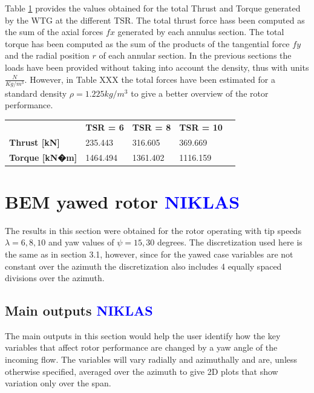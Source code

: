 Table \ref{total_forces_alligned} provides the values obtained for the total Thrust and Torque generated by the WTG at the different TSR. The total thrust force hass been computed as the sum of the axial forces $fx$ generated by each annulus section. The total torque has been computed as the sum of the products of the tangential force $fy$ and the radial position $r$ of each annular section. In the previous sections the loads have been provided without taking into account the density, thus with units $ \frac{N}{Kg/m^3} $. However, in Table XXX the total forces have been estimated for a standard density $\rho = 1.225 kg/m^3$ to give a better overview of the rotor performance.

\begin{table}[htpb]
\begin{tabular}{lllll}
\cline{2-4}
\multicolumn{1}{l|}{}                            & \multicolumn{1}{l|}{\textbf{TSR = 6}} & \multicolumn{1}{l|}{\textbf{TSR = 8}} & \multicolumn{1}{l|}{\textbf{TSR = 10}} &  \\ \cline{1-4}
\multicolumn{1}{|l|}{\textbf{Thrust {[}kN{]}}}   & \multicolumn{1}{l|}{235.443}          & \multicolumn{1}{l|}{316.605}          & \multicolumn{1}{l|}{369.669}           &  \\ \cline{1-4}
\multicolumn{1}{|l|}{\textbf{Torque {[}kN�m{]}}} & \multicolumn{1}{l|}{1464.494}         & \multicolumn{1}{l|}{1361.402}         & \multicolumn{1}{l|}{1116.159}          &  \\ \cline{1-4}
\end{tabular}
\label{total_forces_alligned}
\end{table}


\section{BEM yawed rotor \textcolor{blue}{NIKLAS}}

The results in this section were obtained for the rotor operating with tip speeds $\lambda = 6,8,10$ and yaw values of $\psi = 15, 30$ degrees. The discretization used here is the same as in section 3.1, however, since for the yawed case variables are not constant over the azimuth the discretization also includes 4 equally spaced divisions over the azimuth. 

\subsection{Main outputs \textcolor{blue}{NIKLAS}}
The main outputs in this section would help the user identify how the key variables that affect rotor performance are changed by a yaw angle of the incoming flow. The variables will vary radially and azimuthally and are, unless otherwise specified, averaged over the azimuth to give 2D plots that show variation only over the span.

